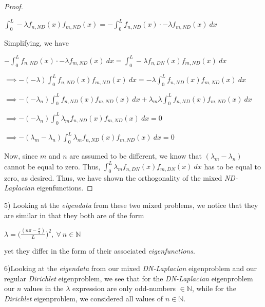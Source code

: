 \documentclass[executivepaper]{article}
\begin{document}
\begin{flushleft}
\begin{proof}
\begin{center}
$\int_{0}^{L} -\lambda f_{n, ND}(x)f_{m, ND}(x)=-\int_{0}^{L} f_{n, ND}(x) \cdot -\lambda f_{m, ND}(x) \ dx$

\end{center}

Simplifying, we have

\begin{center}

$-\int_{0}^{L} f_{n, ND}(x) \cdot -\lambda f_{m, ND}(x) \ dx=\int_{0}^{L} -\lambda f_{n, DN}(x)f_{m, ND}(x) \ dx$

\vspace{2mm}

$\implies -(-\lambda) \int_{0}^{L} f_{n, ND}(x)f_{m, ND}(x) \ dx=-\lambda \int_{0}^{L} f_{n, ND}(x)f_{m, ND}(x) \ dx$

\vspace{2mm}

$\implies -(-\lambda_{n}) \int_{0}^{L} f_{n, ND}(x)f_{m, ND}(x) \ dx + \lambda_{m} \lambda \int_{0}^{L} f_{n, ND}(x)f_{m, ND}(x) \ dx$

\vspace{2mm}

$\implies -(-\lambda_{n}) \int_{0}^{L} \lambda_{m} f_{n, ND}(x)f_{m, ND}(x) \ dx=0$

\vspace{2mm}

$\implies -(\lambda_{m}-\lambda_{n}) \int_{0}^{L} \lambda_{m} f_{n, ND}(x)f_{m, ND}(x) \ dx=0$

\end{center}

Now, since $m$ and $n$ are assumed to be different, we know that $(\lambda_{m}-\lambda_{n})$ cannot be equal to zero. Thus, $\int_{0}^{L} \lambda_{m} f_{n, DN}(x)f_{m, DN}(x) \ dx$ has to be equal to zero, as desired.
Thus, we have shown the orthogonality of the mixed \textit{ND-Laplacian} eigenfunctions.

\end{proof}

5) Looking at the \textit{eigendata} from these two mixed problems, we notice that they are similar in that they both are of the form

\begin{center}

$\lambda=\bigg(\frac{(n \pi - \frac{\pi}{2})}{L}\bigg)^2,  ~ \forall ~ n \in \mathbb{N}$

\end{center}

yet they differ in the form of their associated \textit{eigenfunctions}.

\end{flushleft}

\begin{flushleft}

6)Looking at the \textit{eigendata} from our mixed \textit{DN-Laplacian} eigenproblem and our regular \textit{Dirichlet} eigenproblem, we see that for the \textit{DN-Laplacian} eigenproblem our $n$ values in the $\lambda$ expression are only odd-numbers $\in \mathbb{N}$, while for the \textit{Dirichlet} eigenproblem, we considered all values of $n \in \mathbb{N}$.

\end{flushleft}
\end{document}
